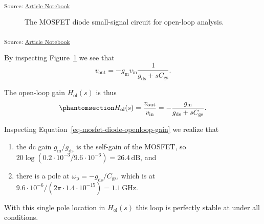 \documentclass[
  a4paper,
  DIV=11,
  numbers=noendperiod]{scrartcl}
\providecommand{\tightlist}{%
  \setlength{\itemsep}{0pt}\setlength{\parskip}{0pt}}\usepackage{longtable,booktabs,array}
\begin{document}
\textsubscript{Source:
\href{https://iic-jku.github.io/analog-circuit-design/index.qmd.html}{Article
Notebook}}

\begin{figure}[H]


\caption{\label{fig-mosfet-diode-openloop}The MOSFET diode small-signal
circuit for open-loop analysis.}

\end{figure}%

\textsubscript{Source:
\href{https://iic-jku.github.io/analog-circuit-design/index.qmd.html}{Article
Notebook}}

By inspecting Figure~\ref{fig-mosfet-diode-openloop} we see that \[
v_\mathrm{out} = - g_\mathrm{m}v_\mathrm{in} \frac{1}{g_\mathrm{ds}+ s C_\mathrm{gs}}.
\]

The open-loop gain \(H_\mathrm{ol}(s)\) is thus
\begin{equation}\phantomsection\label{eq-mosfet-diode-openloop-gain}{
H_\mathrm{ol}(s) = \frac{v_\mathrm{out}}{v_\mathrm{in}} = -\frac{g_\mathrm{m}}{g_\mathrm{ds}+ s C_\mathrm{gs}}.
}\end{equation}

Inspecting Equation~\ref{eq-mosfet-diode-openloop-gain} we realize that

\begin{enumerate}
\def\labelenumi{\arabic{enumi}.}
\tightlist
\item
  the dc gain \(g_\mathrm{m}/ g_\mathrm{ds}\) is the self-gain of the
  MOSFET, so
  \(20 \log(0.2 \cdot 10^{-3} / 9.6 \cdot 10 ^{-6}) = 26.4\,\text{dB}\),
  and
\item
  there is a pole at
  \(\omega_\mathrm{p} = -g_\mathrm{ds}/ C_\mathrm{gs}\), which is at
  \(9.6 \cdot 10 ^{-6} / (2 \pi \cdot 1.4 \cdot 10^{-15}) = 1.1\,\text{GHz}\).
\end{enumerate}

With this single pole location in \(H_\mathrm{ol}(s)\) this loop is
perfectly stable at under all conditions.
\end{document}

